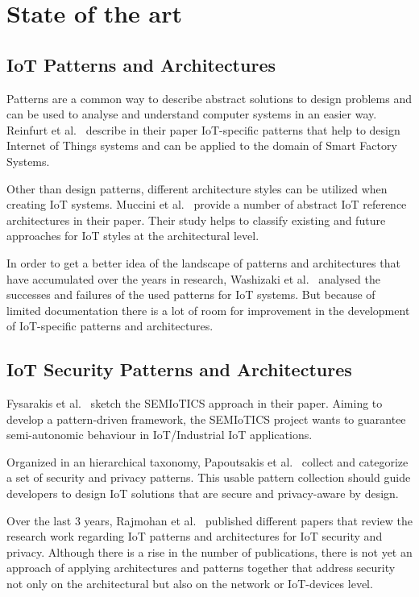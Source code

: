 \documentclass[
    numbers=noenddot,
    parskip=half-,
    fontsize=12pt,
    paper=a4,
    oneside,
    titlepage,
    bibliography=totoc,
    chapterprefix=false,
]{scrbook}
\begin{document}
    \chapter{State of the art}\label{ch:state-of-the-art}
    
    \section{IoT Patterns and Architectures}
    Patterns are a common way to describe abstract solutions to design problems and can be used to analyse and understand computer systems in an easier way. Reinfurt et al.~\cite{Reinfurt2017} describe in their paper IoT-specific patterns that help to design Internet of Things systems and can be applied to the domain of Smart Factory Systems.
    
    Other than design patterns, different architecture styles can be utilized when creating IoT systems. Muccini et al.~\cite{Muccini2018} provide a number of abstract IoT reference architectures in their paper. Their study helps to classify existing and future approaches for IoT styles at the architectural level.
    
    In order to get a better idea of the landscape of patterns and architectures that have accumulated over the years in research, Washizaki et al.~\cite{Washizaki2019, Washizaki2020} analysed the successes and failures of the used patterns for IoT systems. But because of limited documentation there is a lot of room for improvement in the development of IoT-specific patterns and architectures.
    
    \section{IoT Security Patterns and Architectures}
    Fysarakis et al.~\cite{Fysarakis2019} sketch the SEMIoTICS approach in their paper. Aiming to develop a pattern-driven framework, the SEMIoTICS project wants to guarantee semi-autonomic behaviour in IoT/Industrial IoT applications.
    
    Organized in an hierarchical taxonomy, Papoutsakis et al.~\cite{Papoutsakis2021} collect and categorize a set of security and privacy patterns. This usable pattern collection should guide developers to design IoT solutions that are secure and privacy-aware by design.
    
    Over the last 3 years, Rajmohan et al.~\cite{Rajmohan2020, iotbds20, Rajmohan2022} published different papers that review the research work regarding IoT patterns and architectures for IoT security and privacy. Although there is a rise in the number of publications, there is not yet an approach of applying architectures and patterns together that address security not only on the architectural but also on the network or IoT-devices level.
\end{document}
